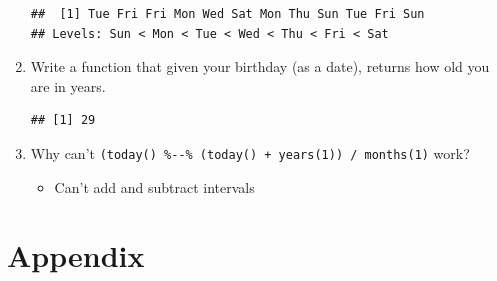 \documentclass[]{book}
\newenvironment{Shaded}{\begin{snugshade}}{\end{snugshade}}
\newcommand{\ControlFlowTok}[1]{\textcolor[rgb]{0.13,0.29,0.53}{\textbf{#1}}}
\newcommand{\DataTypeTok}[1]{\textcolor[rgb]{0.13,0.29,0.53}{#1}}
\newcommand{\DecValTok}[1]{\textcolor[rgb]{0.00,0.00,0.81}{#1}}
\newcommand{\KeywordTok}[1]{\textcolor[rgb]{0.13,0.29,0.53}{\textbf{#1}}}
\newcommand{\NormalTok}[1]{#1}
\newcommand{\OperatorTok}[1]{\textcolor[rgb]{0.81,0.36,0.00}{\textbf{#1}}}
\newcommand{\OtherTok}[1]{\textcolor[rgb]{0.56,0.35,0.01}{#1}}
\newcommand{\StringTok}[1]{\textcolor[rgb]{0.31,0.60,0.02}{#1}}
\providecommand{\tightlist}{%
  \setlength{\itemsep}{0pt}\setlength{\parskip}{0pt}}
\theoremstyle{definition}
\theoremstyle{definition}
\theoremstyle{definition}
\theoremstyle{remark}
\begin{document}
\begin{enumerate}
\begin{Shaded}
\end{Shaded}

\begin{verbatim}
##  [1] Tue Fri Fri Mon Wed Sat Mon Thu Sun Tue Fri Sun
## Levels: Sun < Mon < Tue < Wed < Thu < Fri < Sat
\end{verbatim}
\item
  Write a function that given your birthday (as a date), returns how old
  you are in years.

\begin{Shaded}
\end{Shaded}

\begin{verbatim}
## [1] 29
\end{verbatim}
\item
  Why can't
  \texttt{(today()\ \%-\/-\%\ (today()\ +\ years(1))\ /\ months(1)}
  work?

  \begin{itemize}
  \tightlist
  \item
    Can't add and subtract intervals
  \end{itemize}
\end{enumerate}

\hypertarget{appendix-4}{%
\chapter{Appendix}\label{appendix-4}}
\end{document}
